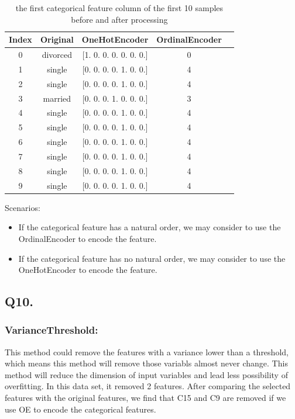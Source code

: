 \documentclass{article}
\begin{document}
\begin{table}[h!]
    \centering
    \small
    \begin{tabular}{|c|c|c|c|c|}
        \hline
        Index & Original & OneHotEncoder & OrdinalEncoder \\
        \hline
        0  & divorced & [1. 0. 0. 0. 0. 0. 0.] & 0  \\
        1  & single & [0. 0. 0. 0. 1. 0. 0.] & 4  \\
        2  & single & [0. 0. 0. 0. 1. 0. 0.] & 4 \\
        3  & married &  [0. 0. 0. 1. 0. 0. 0.] & 3  \\
        4  & single &  [0. 0. 0. 0. 1. 0. 0.] & 4 \\
        5  & single &  [0. 0. 0. 0. 1. 0. 0.] & 4  \\
        6  & single & [0. 0. 0. 0. 1. 0. 0.] & 4  \\
        7  & single & [0. 0. 0. 0. 1. 0. 0.] & 4  \\
        8  & single &  [0. 0. 0. 0. 1. 0. 0.] & 4  \\
        9  & single &  [0. 0. 0. 0. 1. 0. 0.] & 4  \\
        \hline
    \end{tabular}
    \caption{ the first categorical feature column of the first 10 samples before and after processing}
    \label{tab:Categorical}
\end{table}

Scenarios:

\begin{itemize}
    \item If the categorical feature has a natural order, we may consider to use the OrdinalEncoder to encode the feature.
    \item If the categorical feature has no natural order, we may consider to use the OneHotEncoder to encode the feature.
\end{itemize}

\subsection*{Q10.}

\subsubsection*{VarianceThreshold:}

This method could remove the features with a variance lower than a threshold, which means this method will remove those variabls almost never change. This method will reduce the dimension of input variables and lead less possibility of overfitting. 
In this data set, it removed 2 features. 
After comparing the selected features with the original features, 
we find that C15 and C9 are removed if we use OE to encode the categorical features.
\end{document}
